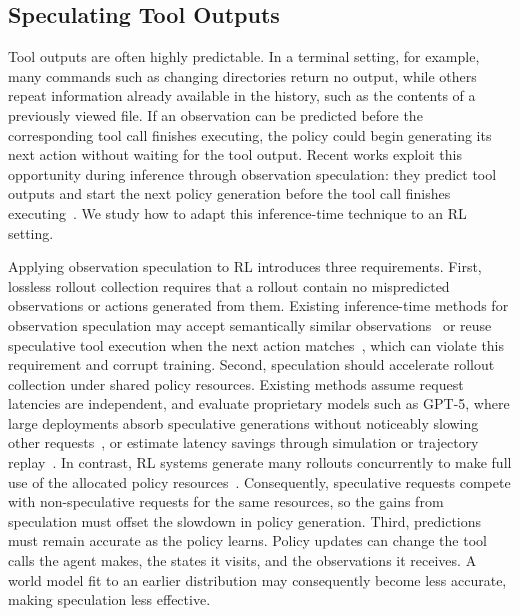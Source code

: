 \documentclass{article} %
\begin{document}
\subsection{Speculating Tool Outputs}
\label{sec:observation-speculation}
Tool outputs are often highly predictable. In a terminal setting, for example, many commands such as changing directories return no output, while others repeat information already available in the history, such as the contents of a previously viewed file. If an observation can be predicted before the corresponding tool call finishes executing, the policy could begin generating its next action without waiting for the tool output. Recent works exploit this opportunity during inference through observation speculation: they predict tool outputs and start the next policy generation before the tool call finishes executing~\citep{ye2025speculative,cao2026auton,saberi2026spechop,li2026speculate,chen2026aospec}. We study how to adapt this inference-time technique to an RL setting.

Applying observation speculation to RL introduces three requirements. First, lossless rollout collection requires that a rollout contain no mispredicted observations or actions generated from them. Existing inference-time methods for observation speculation may accept semantically similar observations~\citep{saberi2026spechop} or reuse speculative tool execution when the next action matches~\citep{ye2025speculative,li2026speculate}, which can violate this requirement and corrupt training. Second, speculation should accelerate rollout collection under shared policy resources. Existing methods assume request latencies are independent, and evaluate proprietary models such as GPT-5, where large deployments absorb speculative generations without noticeably slowing other requests~\citep{ye2025speculative,li2026speculate}, or estimate latency savings through simulation or trajectory replay~\citep{saberi2026spechop,chen2026aospec}. In contrast, RL systems generate many rollouts concurrently to make full use of the allocated policy resources~\citep{sheng2025hybridflow,fu2026areal,piche2025pipelinerl}. Consequently, speculative requests compete with non-speculative requests for the same resources, so the gains from speculation must offset the slowdown in policy generation. Third, predictions must remain accurate as the policy learns. Policy updates can change the tool calls the agent makes, the states it visits, and the observations it receives. A world model fit to an earlier distribution may consequently become less accurate, making speculation less effective.
\end{document}
